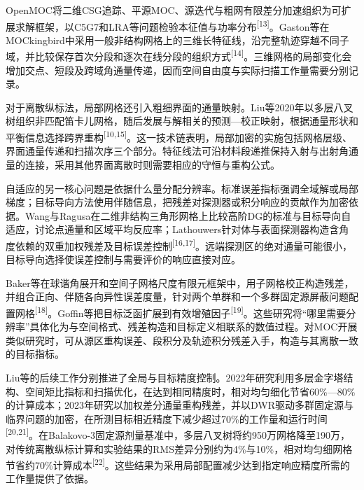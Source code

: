 \documentclass[UTF8, zihao=-4, fontset=none, a4paper]{ctexart}
\newcommand{\upcite}[1]{\textsuperscript{[#1]}}
\begin{document}
OpenMOC将二维CSG追踪、平源MOC、源迭代与粗网有限差分加速组织为可扩展求解框架，以C5G7和LRA等问题检验本征值与功率分布\upcite{13}。Gaston等在MOCkingbird中采用一般非结构网格上的三维长特征线，沿完整轨迹穿越不同子域，并比较保存首次分段和逐次在线分段的组织方式\upcite{14}。三维网格的局部变化会增加交点、短段及跨域角通量传递，因而空间自由度与实际扫描工作量需要分别记录。

对于离散纵标法，局部网格还引入粗细界面的通量映射。Liu等2020年以多层八叉树组织非匹配笛卡儿网格，随后发展与解相关的预测---校正映射，根据通量形状和平衡信息选择跨界重构\upcite{10,15}。这一技术链表明，局部加密的实施包括网格层级、界面通量传递和扫描次序三个部分。特征线法可沿材料段递推保持入射与出射角通量的连接，采用其他界面离散时则需要相应的守恒与重构公式。

自适应的另一核心问题是依据什么量分配分辨率。标准误差指标强调全域解或局部梯度；目标导向方法使用伴随信息，把残差对探测器或积分响应的贡献作为加密依据。Wang与Ragusa在二维非结构三角形网格上比较高阶DG的标准与目标导向自适应，讨论点通量和区域平均反应率；Lathouwers针对体与表面探测器构造含角度依赖的双重加权残差及目标误差控制\upcite{16,17}。远端探测区的绝对通量可能很小，目标导向选择使误差控制与需要评价的响应直接对应。

Baker等在球谐角展开和空间子网格尺度有限元框架中，用子网格校正构造残差，并组合正向、伴随各向异性误差度量，针对两个单群和一个多群固定源屏蔽问题配置网格\upcite{18}。Goffin等把目标泛函扩展到有效增殖因子\upcite{19}。这些研究将“哪里需要分辨率”具体化为与空间格式、残差构造和目标定义相联系的数值过程。对MOC开展类似研究时，可从源区重构误差、段积分及轨迹积分残差入手，构造与其离散一致的目标指标。

Liu等的后续工作分别推进了全局与目标精度控制。2022年研究利用多层金字塔结构、空间矩比指标和扫描优化，在达到相同精度时，相对均匀细化节省60\%---80\%的计算成本；2023年研究以加权差分通量重构残差，并以DWR驱动多群固定源与临界问题的加密，在所测目标相近精度下减少超过70\%的工作量和运行时间\upcite{20,21}。在Balakovo-3固定源剂量基准中，多层八叉树将约950万网格降至190万，对传统离散纵标计算和实验结果的RMS差异分别约为4\%与10\%，相对均匀细网格节省约70\%计算成本\upcite{22}。这些结果为采用局部配置减少达到指定响应精度所需的工作量提供了依据。
\end{document}
